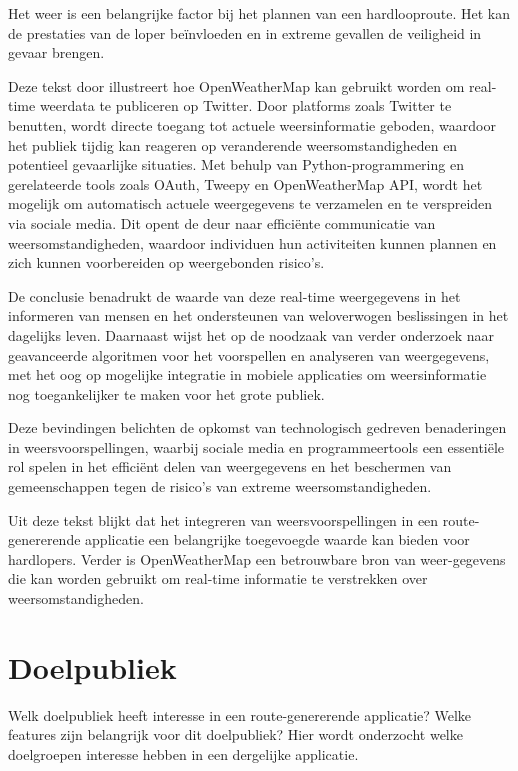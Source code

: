     Het weer is een belangrijke factor bij het plannen van een hardlooproute. Het kan de prestaties van de loper beïnvloeden en in extreme gevallen de veiligheid in gevaar brengen.

    Deze tekst door \textcite{dewi2019} illustreert hoe OpenWeatherMap kan gebruikt worden om real-time weerdata te publiceren op Twitter.
    Door platforms zoals Twitter te benutten, wordt directe toegang tot actuele weersinformatie geboden, waardoor het publiek tijdig kan reageren op veranderende weersomstandigheden en potentieel gevaarlijke situaties.
    Met behulp van Python-programmering en gerelateerde tools zoals OAuth, Tweepy en OpenWeatherMap API, wordt het mogelijk om automatisch actuele weergegevens te verzamelen en te verspreiden via sociale media. 
    Dit opent de deur naar efficiënte communicatie van weersomstandigheden, waardoor individuen hun activiteiten kunnen plannen en zich kunnen voorbereiden op weergebonden risico's.

    De conclusie benadrukt de waarde van deze real-time weergegevens in het informeren van mensen en het ondersteunen van weloverwogen beslissingen in het dagelijks leven. 
    Daarnaast wijst het op de noodzaak van verder onderzoek naar geavanceerde algoritmen voor het voorspellen en analyseren van weergegevens, 
    met het oog op mogelijke integratie in mobiele applicaties om weersinformatie nog toegankelijker te maken voor het grote publiek.

    Deze bevindingen belichten de opkomst van technologisch gedreven benaderingen in weersvoorspellingen, waarbij sociale media en programmeertools een essentiële rol spelen 
    in het efficiënt delen van weergegevens en het beschermen van gemeenschappen tegen de risico's van extreme weersomstandigheden.
    \autocite{dewi2019}

    Uit deze tekst blijkt dat het integreren van weersvoorspellingen in een route-genererende applicatie een belangrijke toegevoegde waarde kan bieden voor hardlopers. 
    Verder is OpenWeatherMap een betrouwbare bron van weer-gegevens die kan worden gebruikt om real-time informatie te verstrekken over weersomstandigheden.


    \section{Doelpubliek}

    Welk doelpubliek heeft interesse in een route-genererende applicatie? Welke features zijn belangrijk voor dit doelpubliek?
    Hier wordt onderzocht welke doelgroepen interesse hebben in een dergelijke applicatie.


